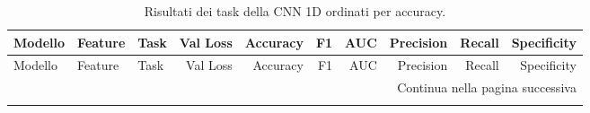 \documentclass{article}
\begin{document}
\begin{landscape}

\scriptsize

\setlength{\tabcolsep}{3pt}
\renewcommand{\arraystretch}{1.15}

\begin{longtable}{p{4.2cm} p{5.2cm} p{1.4cm} rrrrrrr}

\caption{Risultati dei task della CNN 1D ordinati per accuracy.}
\label{tab:cnn_tasks}
\\

\toprule

Modello &
Feature &
Task &
Val Loss &
Accuracy &
F1 &
AUC &
Precision &
Recall &
Specificity
\\

\midrule

\endfirsthead


\toprule

Modello &
Feature &
Task &
Val Loss &
Accuracy &
F1 &
AUC &
Precision &
Recall &
Specificity
\\

\midrule

\endhead


\midrule
\multicolumn{10}{r}{Continua nella pagina successiva} \\

\endfoot


\bottomrule
\endlastfoot


\end{longtable}
\end{landscape}
\end{document}
